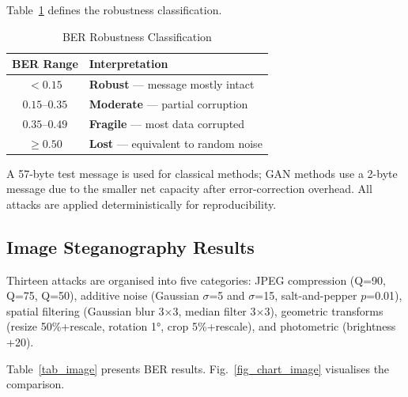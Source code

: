\documentclass[conference]{IEEEtran}
\begin{document}
Table~\ref{tab_ber_legend} defines the robustness classification.

\begin{table}[htbp]
\caption{BER Robustness Classification}
\begin{center}
\begin{tabular}{|c|l|}
\hline
\textbf{BER Range} & \textbf{Interpretation} \\
\hline
$< 0.15$       & \textbf{Robust} — message mostly intact \\
$0.15$--$0.35$ & \textbf{Moderate} — partial corruption \\
$0.35$--$0.49$ & \textbf{Fragile} — most data corrupted \\
$\geq 0.50$    & \textbf{Lost} — equivalent to random noise \\
\hline
\end{tabular}
\label{tab_ber_legend}
\end{center}
\end{table}

A 57-byte test message is used for classical methods; GAN methods use
a 2-byte message due to the smaller net capacity after error-correction
overhead. All attacks are applied deterministically for reproducibility.

\subsection{Image Steganography Results}

Thirteen attacks are organised into five categories: JPEG compression
(Q=90, Q=75, Q=50), additive noise (Gaussian $\sigma$=5 and $\sigma$=15,
salt-and-pepper $p$=0.01), spatial filtering (Gaussian blur 3$\times$3,
median filter 3$\times$3), geometric transforms (resize 50\%+rescale,
rotation 1°, crop 5\%+rescale), and photometric (brightness +20).

Table~\ref{tab_image} presents BER results. Fig.~\ref{fig_chart_image}
visualises the comparison.
\end{document}
